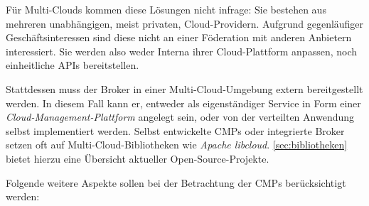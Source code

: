 Für Multi-Clouds kommen diese Lösungen nicht infrage: Sie bestehen aus mehreren unabhängigen, meist privaten, Cloud-Providern. Aufgrund gegenläufiger Geschäftsinteressen sind diese nicht an einer Föderation mit anderen Anbietern interessiert. Sie werden also weder Interna ihrer Cloud-Plattform anpassen, noch einheitliche APIs bereitstellen.

Stattdessen muss der Broker in einer Multi-Cloud-Umgebung extern bereitgestellt werden. In diesem Fall kann er, entweder als eigenständiger Service in Form einer \emph{Cloud-Management-Plattform} angelegt sein, oder von der verteilten Anwendung selbst implementiert werden. Selbst entwickelte CMPs oder integrierte Broker setzen oft auf Multi-Cloud-Bibliotheken wie \emph{Apache libcloud}. \autoref{sec:bibliotheken} bietet hierzu eine Übersicht aktueller Open-Source-Projekte. 

Folgende weitere Aspekte sollen bei der Betrachtung der CMPs berücksichtigt werden:

